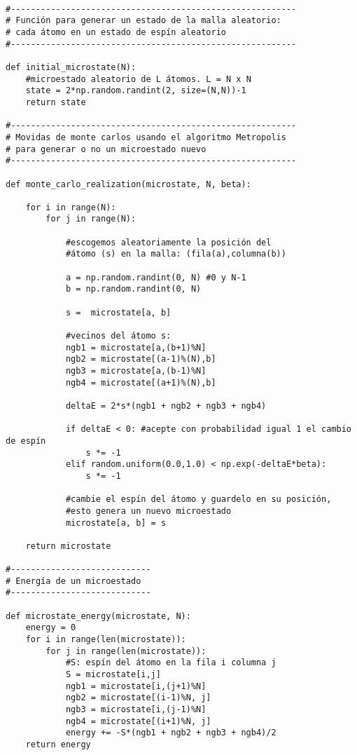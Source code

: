 \documentclass[a4paper,12pt]{article}
\begin{document}
   \begin{verbatim}
     
#---------------------------------------------------------
# Función para generar un estado de la malla aleatorio:
# cada átomo en un estado de espín aleatorio
#---------------------------------------------------------

def initial_microstate(N):   
    #microestado aleatorio de L átomos. L = N x N
    state = 2*np.random.randint(2, size=(N,N))-1
    return state

#---------------------------------------------------------
# Movidas de monte carlos usando el algoritmo Metropolis 
# para generar o no un microestado nuevo
#---------------------------------------------------------

def monte_carlo_realization(microstate, N, beta):
   
    for i in range(N):
        for j in range(N):
            
            #escogemos aleatoriamente la posición del 
            #átomo (s) en la malla: (fila(a),columna(b))
                
            a = np.random.randint(0, N) #0 y N-1
            b = np.random.randint(0, N)
            
            s =  microstate[a, b]
                
            #vecinos del átomo s:
            ngb1 = microstate[a,(b+1)%N]
            ngb2 = microstate[(a-1)%(N),b]
            ngb3 = microstate[a,(b-1)%N]
            ngb4 = microstate[(a+1)%(N),b]
            
            deltaE = 2*s*(ngb1 + ngb2 + ngb3 + ngb4)
            
            if deltaE < 0: #acepte con probabilidad igual 1 el cambio de espín
                s *= -1
            elif random.uniform(0.0,1.0) < np.exp(-deltaE*beta):
                s *= -1
                    
            #cambie el espín del átomo y guardelo en su posición, 
            #esto genera un nuevo microestado
            microstate[a, b] = s
                
    return microstate

#----------------------------
# Energía de un microestado
#----------------------------

def microstate_energy(microstate, N):
    energy = 0
    for i in range(len(microstate)):
        for j in range(len(microstate)):
            #S: espín del átomo en la fila i columna j
            S = microstate[i,j]
            ngb1 = microstate[i,(j+1)%N]
            ngb2 = microstate[(i-1)%N, j]
            ngb3 = microstate[i,(j-1)%N]
            ngb4 = microstate[(i+1)%N, j]
            energy += -S*(ngb1 + ngb2 + ngb3 + ngb4)/2     
    return energy


\end{verbatim}
\end{document}
